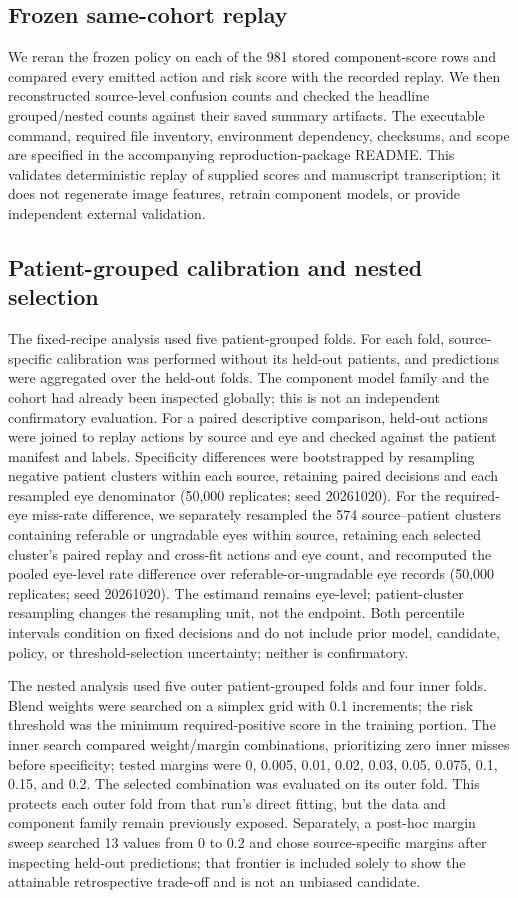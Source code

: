 \documentclass[11pt]{article}
\begin{document}
\subsection{Frozen same-cohort replay}
We reran the frozen policy on each of the 981 stored component-score rows and compared every emitted action and risk score with the recorded replay. We then reconstructed source-level confusion counts and checked the headline grouped/nested counts against their saved summary artifacts. The executable command, required file inventory, environment dependency, checksums, and scope are specified in the accompanying reproduction-package README. This validates deterministic replay of supplied scores and manuscript transcription; it does not regenerate image features, retrain component models, or provide independent external validation.

\subsection{Patient-grouped calibration and nested selection}
The fixed-recipe analysis used five patient-grouped folds. For each fold, source-specific calibration was performed without its held-out patients, and predictions were aggregated over the held-out folds. The component model family and the cohort had already been inspected globally; this is not an independent confirmatory evaluation. For a paired descriptive comparison, held-out actions were joined to replay actions by source and eye and checked against the patient manifest and labels. Specificity differences were bootstrapped by resampling negative patient clusters within each source, retaining paired decisions and each resampled eye denominator (50,000 replicates; seed 20261020). For the required-eye miss-rate difference, we separately resampled the 574 source--patient clusters containing referable or ungradable eyes within source, retaining each selected cluster's paired replay and cross-fit actions and eye count, and recomputed the pooled eye-level rate difference over referable-or-ungradable eye records (50,000 replicates; seed 20261020). The estimand remains eye-level; patient-cluster resampling changes the resampling unit, not the endpoint. Both percentile intervals condition on fixed decisions and do not include prior model, candidate, policy, or threshold-selection uncertainty; neither is confirmatory.

The nested analysis used five outer patient-grouped folds and four inner folds. Blend weights were searched on a simplex grid with 0.1 increments; the risk threshold was the minimum required-positive score in the training portion. The inner search compared weight/margin combinations, prioritizing zero inner misses before specificity; tested margins were 0, 0.005, 0.01, 0.02, 0.03, 0.05, 0.075, 0.1, 0.15, and 0.2. The selected combination was evaluated on its outer fold. This protects each outer fold from that run's direct fitting, but the data and component family remain previously exposed. Separately, a post-hoc margin sweep searched 13 values from 0 to 0.2 and chose source-specific margins after inspecting held-out predictions; that frontier is included solely to show the attainable retrospective trade-off and is not an unbiased candidate.
\end{document}
